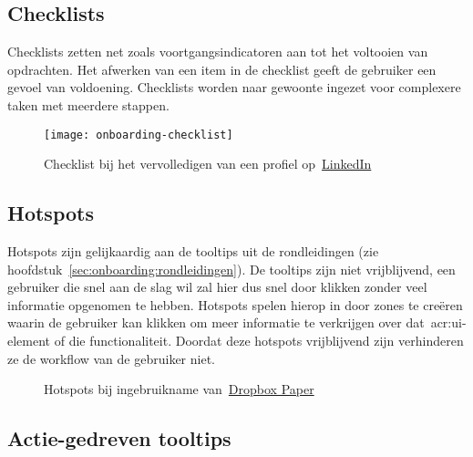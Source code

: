 \subsection{Checklists}
\label{sec:onboarding:checklists}

Checklists zetten net zoals voortgangsindicatoren aan tot het voltooien van opdrachten. Het afwerken van een item in de checklist geeft de gebruiker een gevoel van voldoening. Checklists worden naar gewoonte ingezet voor complexere taken met meerdere stappen.

\begin{figure}[h!]
    \centering
    \texttt{[image: onboarding-checklist]}
    \caption[Voorbeeld checklist]{Checklist bij het vervolledigen van een profiel op~\href{https://www.linkedin.com/}{LinkedIn}}
    \label{fig:onboarding:checklist}
\end{figure}

\subsection{Hotspots}
\label{sec:onboarding:hotspots}

Hotspots zijn gelijkaardig aan de tooltips uit de rondleidingen (zie hoofdstuk~\ref{sec:onboarding:rondleidingen}). De tooltips zijn niet vrijblijvend, een gebruiker die snel aan de slag wil zal hier dus snel door klikken zonder veel informatie opgenomen te hebben. Hotspots spelen hierop in door zones te creëren waarin de gebruiker kan klikken om meer informatie te verkrijgen over dat~\acrshort{acr:ui}-element of die functionaliteit. Doordat deze hotspots vrijblijvend zijn verhinderen ze de workflow van de gebruiker niet.

\begin{figure}[h!]
    \centering
    \qquad
    \caption[Voorbeeld hotspots]{Hotspots bij ingebruikname van~\href{https://www.dropbox.com/paper}{Dropbox Paper}}
    \label{fig:onboarding:hotspots}
\end{figure}

\subsection{Actie-gedreven tooltips}
\label{sec:onboarding:actie-tooltips}

